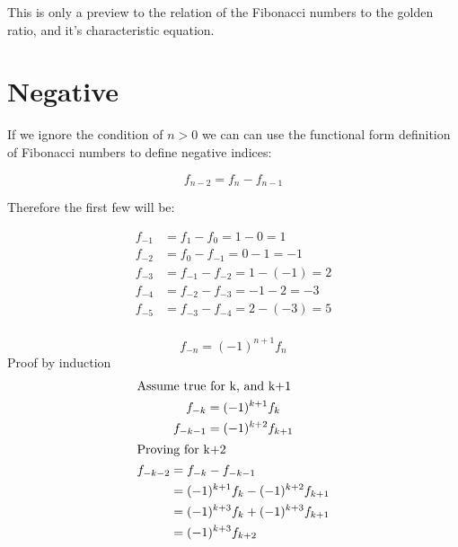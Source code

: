 \documentclass[a4paper]{article}
\begin{document}
This is only a preview to the relation of the Fibonacci numbers to the golden ratio, and it's characteristic equation.

\section{Negative}\label{sec:negative}
If we ignore the condition of $n>0$ we can can use the functional form definition of Fibonacci numbers to define negative indices:

\begin{equation}
f_{n-2} = f_n - f_{n-1}\label{eq:equation3}
\end{equation}

%

Therefore the first few will be:

\begin{align*}
f_{-1} &= f_{1} - f_{0} = 1 - 0 = 1\\
f_{-2} &= f_{0} - f_{-1} = 0 - 1 = -1\\
f_{-3} &= f_{-1} - f_{-2} = 1 - (-1) = 2\\
f_{-4} &= f_{-2} - f_{-3} = -1 - 2 = -3\\
f_{-5} &= f_{-3} - f_{-4} = 2 - (-3)= 5\\
\end{align*}

\begin{theorem}
\[
f_{-n} = (-1)^{n+1} f_{n}
\]
Proof by induction
\begin{gather*}
\shortintertext{Assume true for k, and k+1}
f_{-k} = (-1)^{k+1} f_{k}\\
f_{-k-1} = (-1)^{k+2} f_{k+1}\\
\shortintertext{Proving for k+2}
\begin{split}
f_{-k-2} &= f_{-k} - f_{-k-1} \\
		&= (-1)^{k+1} f_{k} - (-1)^{k+2} f_{k+1}\\
		 &= (-1)^{k+3} f_{k} + (-1)^{k+3} f_{k+1} \\
		 &= (-1)^{k+3} f_{k+2}
\\
\end{split}
\end{gather*}
\end{theorem}
\end{document}
